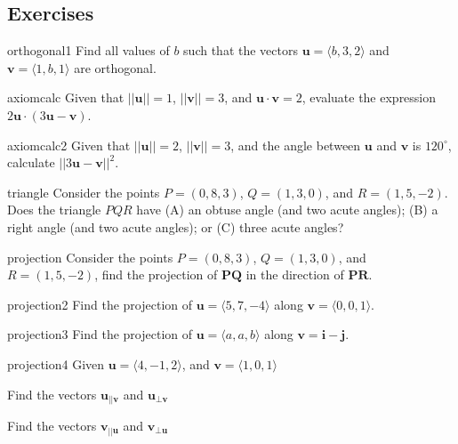 \subsection{Exercises}

\begin{problem}{orthogonal1}
     Find all values of $b$ such that the vectors $\bm{u} = \langle b,3,2\rangle$ and $\bm{v} = \langle 1,b,1\rangle$ are orthogonal.
\end{problem}

\begin{problem}{axiomcalc}
    Given that $||\bm{u}|| = 1$, $||\bm{v}|| = 3$, and $\bm{u} \cdot \bm{v} = 2$, evaluate the expression $2\bm{u} \cdot (3\bm{u} - \bm{v})$.
\end{problem}

\begin{problem}{axiomcalc2}
    Given that $||\bm{u}|| = 2$, $||\bm{v}|| = 3$, and the angle between $\bm{u}$ and $\bm{v}$ is $120^\circ$, calculate $||3\bm{u}-\bm{v}||^2$.
\end{problem}

\begin{problem}{triangle}
    Consider the points $P= (0,8,3)$, $Q= (1,3,0)$, and $R= (1,5,-2)$.   Does the triangle $PQR$ have (A) an obtuse angle (and two acute angles); (B) a right angle (and two acute angles); or (C) three acute angles?
\end{problem}

\begin{problem}{projection}
    Consider the points $P= (0,8,3)$, $Q= (1,3,0)$, and $R= (1,5,-2)$, find the projection of $\bm{PQ}$ in the direction of $\bm{PR}$.
\end{problem}

\begin{problem}{projection2}
    Find the projection of $\bm{u} = \langle 5,7,-4\rangle$ along $\bm{v} = \langle0,0,1\rangle$.
\end{problem}

\begin{problem}{projection3}
    Find the projection of $\bm{u} = \langle a,a,b\rangle$ along $\bm{v} = \bm{i} - \bm{j}$.
\end{problem}

\begin{problem}{projection4}
    Given $\bm{u} = \langle 4, -1, 2 \rangle$, and $\bm{v} = \langle 1, 0, 1 \rangle$
    
    \begin{subproblems}
    \item Find the vectors $\bm{u}_{||\bm{v}}$ and $\bm{u}_{\bot\bm{v}}$
    \item Find the vectors $\bm{v}_{||\bm{u}}$ and $\bm{v}_{\bot\bm{u}}$
    \end{subproblems}
    
\end{problem}


